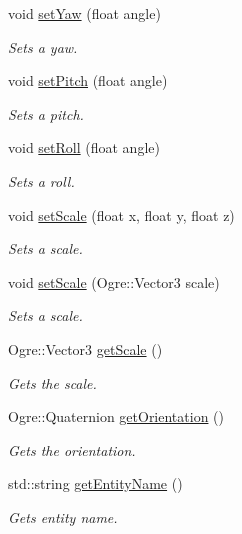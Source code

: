 \begin{DoxyCompactItemize}
void \hyperlink{class_objects_1_1_i_object_accebddb15710d11fea7b25f0c77aeab0}{set\-Yaw} (float angle)
\begin{DoxyCompactList}\small\item\em Sets a yaw. \end{DoxyCompactList}\item 
void \hyperlink{class_objects_1_1_i_object_a2b67f17e64732f0c7c984414a32d1f64}{set\-Pitch} (float angle)
\begin{DoxyCompactList}\small\item\em Sets a pitch. \end{DoxyCompactList}\item 
void \hyperlink{class_objects_1_1_i_object_aba95ce780536135ac15eb6bf87098ea0}{set\-Roll} (float angle)
\begin{DoxyCompactList}\small\item\em Sets a roll. \end{DoxyCompactList}\item 
void \hyperlink{class_objects_1_1_i_object_a3f67350d8eb911ce44814f3a109cf273}{set\-Scale} (float x, float y, float z)
\begin{DoxyCompactList}\small\item\em Sets a scale. \end{DoxyCompactList}\item 
void \hyperlink{class_objects_1_1_i_object_a688a2ba3aa58342ff006677c4995411b}{set\-Scale} (Ogre\-::\-Vector3 scale)
\begin{DoxyCompactList}\small\item\em Sets a scale. \end{DoxyCompactList}\item 
Ogre\-::\-Vector3 \hyperlink{class_objects_1_1_i_object_ae03ab75fddc9cd990a4a9bf5137cb00f}{get\-Scale} ()
\begin{DoxyCompactList}\small\item\em Gets the scale. \end{DoxyCompactList}\item 
Ogre\-::\-Quaternion \hyperlink{class_objects_1_1_i_object_a8eafa5d8f1638d50de0cdd34d03e4350}{get\-Orientation} ()
\begin{DoxyCompactList}\small\item\em Gets the orientation. \end{DoxyCompactList}\item 
std\-::string \hyperlink{class_objects_1_1_i_object_aea013005572b9493886fc0b4a12d42ba}{get\-Entity\-Name} ()
\begin{DoxyCompactList}\small\item\em Gets entity name. \end{DoxyCompactList}\item 

\end{DoxyCompactItemize}
